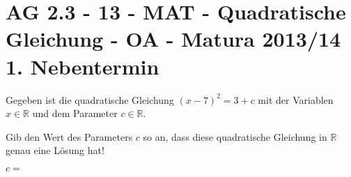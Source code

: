 \section{AG 2.3 - 13 - MAT - Quadratische Gleichung - OA - Matura 2013/14 1. Nebentermin}

\begin{beispiel}[AG 2.3]{1} %
				Gegeben ist die quadratische Gleichung $(x-7)^2=3+c$ mit der Variablen $x\in\mathbb{R}$ und dem Parameter $c\in\mathbb{R}$.
				
				Gib den Wert des Parameters $c$ so an, dass diese quadratische Gleichung in $\mathbb{R}$ genau eine Lösung hat!
				
				$c=$ 
\end{beispiel}